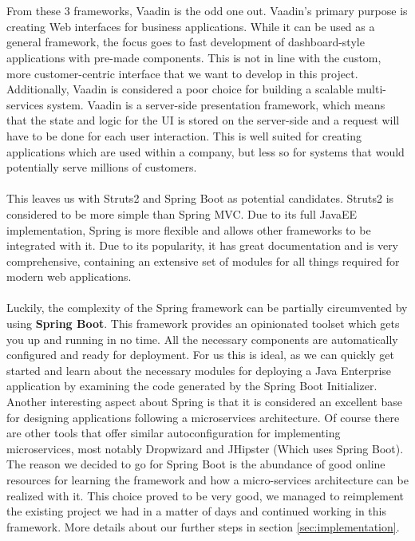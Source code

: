 \documentclass[12pt]{article}
\begin{document}
\begin{multicols}{2}
\\\\
From these 3 frameworks, Vaadin is the odd one out. Vaadin's primary purpose is creating Web interfaces for business applications. While it can be used as a general framework, the focus goes to fast development of dashboard-style applications with pre-made components. This is not in line with the custom, more customer-centric interface that we want to develop in this project. Additionally, Vaadin is considered a poor choice for building a scalable multi-services system. \cite{VaadinDisadvantages47:online} Vaadin is a server-side presentation framework, which means that the state and logic for the UI is stored on the server-side and a request will have to be done for each user interaction. This is well suited for creating applications which are used within a company, but less so for systems that would potentially serve millions of customers.
\\\\
This leaves us with Struts2 and Spring Boot as potential candidates. Struts2 is considered to be more simple than Spring MVC. Due to its full JavaEE implementation, Spring is more flexible and allows other frameworks to be integrated with it. Due to its popularity, it has great documentation and is very comprehensive, containing an extensive set of modules for all things required for modern web applications. \cite{StrutsVsSpring72:online} 
\\\\
Luckily, the complexity of the Spring framework can be partially circumvented by using \textbf{Spring Boot}. This framework provides an opinionated toolset which gets you up and running in no time. All the necessary components are automatically configured and ready for deployment. For us this is ideal, as we can quickly get started and learn about the necessary modules for deploying a Java Enterprise application by examining the code generated by the Spring Boot Initializer. Another interesting aspect about Spring is that it is considered an excellent base for designing applications following a microservices architecture. \cite{SpringMicroservices35:online} \cite{MicroservicesFrameworks85:online} Of course there are other tools that offer similar autoconfiguration for implementing microservices, most notably Dropwizard and JHipster (Which uses Spring Boot). The reason we decided to go for Spring Boot is the abundance of good online resources for learning the framework and how a micro-services architecture can be realized with it. This choice proved to be very good, we managed to reimplement the existing project we had in a matter of days and continued working in this framework. More details about our further steps in section \ref{sec:implementation}.


\end{multicols}
\end{document}
